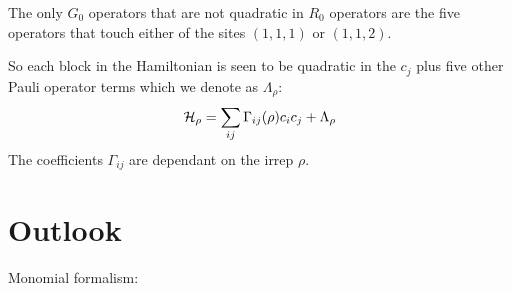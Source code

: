 \documentclass[12pt]{article}
\begin{document}
The only $G_0$ operators that are not 
quadratic in $R_0$ operators are the five
operators that touch either of the sites
$(1,1,1)$ or $(1,1,2)$.

So each block in the Hamiltonian
is seen to be quadratic in the $c_j$ plus
five other Pauli operator terms which we denote as $\Lambda_\rho$:
$$
    \mathcal{H}_\rho = \sum_{ij} \Gamma_{ij}(\rho) c_i c_j + \Lambda_\rho
$$
The coefficients $\Gamma_{ij}$ are dependant on the irrep $\rho.$


%
%

%



%
%

\section{Outlook}

Monomial formalism: \cite{Van2011}




{}

\end{document}
